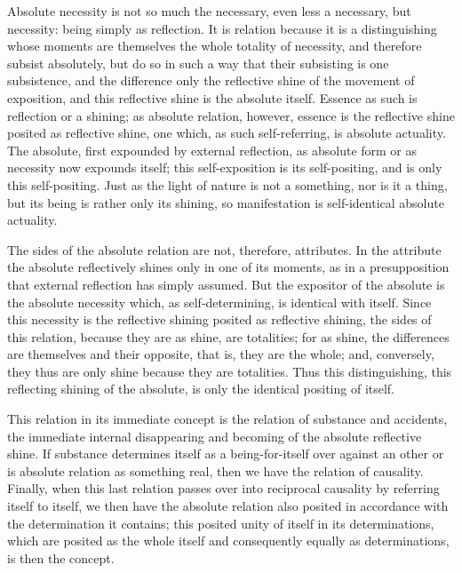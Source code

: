 Absolute necessity is not so much the necessary,
even less a necessary, but necessity:
being simply as reflection.
It is relation because it is a distinguishing
whose moments are themselves the whole totality of necessity,
and therefore subsist absolutely,
but do so in such a way that their subsisting is one subsistence,
and the difference only the reflective shine of
the movement of exposition,
and this reflective shine is the absolute itself.
Essence as such is reflection or a shining;
as absolute relation, however, essence is the
reflective shine posited as reflective shine,
one which, as such self-referring, is absolute actuality.
The absolute, first expounded by external reflection,
as absolute form or as necessity now expounds itself;
this self-exposition is its self-positing,
and is only this self-positing.
Just as the light of nature is not a something,
nor is it a thing, but its being is rather only its shining,
so manifestation is self-identical absolute actuality.

The sides of the absolute relation are not, therefore, attributes.
In the attribute the absolute reflectively shines only in one of its moments,
as in a presupposition that external reflection has simply assumed.
But the expositor of the absolute is the absolute necessity
which, as self-determining, is identical with itself.
Since this necessity is the reflective shining
posited as reflective shining, the sides of this relation,
because they are as shine, are totalities;
for as shine, the differences are themselves and their opposite,
that is, they are the whole;
and, conversely, they thus are only shine because they are totalities.
Thus this distinguishing, this reflecting shining of the absolute,
is only the identical positing of itself.

This relation in its immediate concept is
the relation of substance and accidents,
the immediate internal disappearing and becoming
of the absolute reflective shine.
If substance determines itself as a being-for-itself over
against an other or is absolute relation as something real,
then we have the relation of causality.
Finally, when this last relation passes over into
reciprocal causality by referring itself to itself,
we then have the absolute relation also posited
in accordance with the determination it contains;
this posited unity of itself in its determinations,
which are posited as the whole itself
and consequently equally as determinations,
is then the concept.
